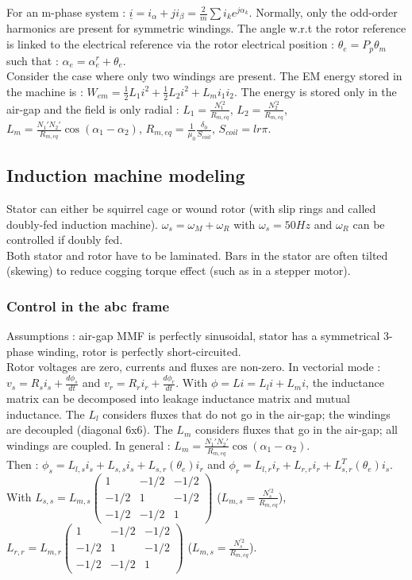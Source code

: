 \documentclass[../main.tex]{subfiles}
\begin{document}
For an m-phase system : $\underline{i} = i_\alpha + j i_\beta = \frac{2}{m} \sum i_k e^{j\alpha_k}$. Normally, only the odd-order harmonics are present for symmetric windings. The angle w.r.t the rotor reference is linked to the electrical reference via the rotor electrical position : $\theta_e = P_p \theta_m$ such that : $\alpha_e = \alpha_e^r + \theta_e$.\\

Consider the case where only two windings are present. The EM energy stored in the machine is : $W_{em} = \frac{1}{2} L_1 i^2 + \frac{1}{2}L_2 i^2 + L_m i_1 i_2$. The energy is stored only in the air-gap and the field is only radial : $L_1 = \frac{N_1^{'2}}{R_{m,eq}}$, $L_2 = \frac{N_2^{'2}}{R_{m,eq}}$, $L_m = \frac{N_1' N_2'}{R_{m,eq}} \cos(\alpha_1-\alpha_2)$, $R_{m,eq} = \frac{1}{\mu_0} \frac{\delta_0}{S_{coil}}$, $S_{coil} = lr\pi$.

\subsection{Induction machine modeling}
Stator can either be squirrel cage or wound rotor (with slip rings and called doubly-fed induction machine). $\omega_s = \omega_M + \omega_R$ with $\omega_s = 50Hz$ and $\omega_R$ can be controlled if doubly fed.\\
Both stator and rotor have to be laminated. Bars in the stator are often tilted (skewing) to reduce cogging torque effect (such as in a stepper motor). \\

\subsubsection{Control in the abc frame}
Assumptions : air-gap MMF is perfectly sinusoidal, stator has a symmetrical 3-phase winding, rotor is perfectly short-circuited. \\

Rotor voltages are zero, currents and fluxes are non-zero. In vectorial mode : $v_s = R_s i_s + \frac{d\phi_s}{dt}$ and $v_r = R_r i_r + \frac{d\phi_r}{dt}$. With $\phi = Li = L_l i + L_mi$, the inductance matrix can be decomposed into leakage inductance matrix and mutual inductance. The $L_l$ considers fluxes that do not go in the air-gap; the windings are decoupled (diagonal 6x6). The $L_m$ considers fluxes that go in the air-gap; all windings are coupled. In general : $L_m = \frac{N_1'N_2'}{R_{m,eq}} \cos(\alpha_1-\alpha_2)$.\\
Then : $\phi_s = L_{l,s} i_s + L_{s,s} i_s+ L_{s,r}(\theta_e) i_r$ and $\phi_r = L_{l,r} i_r + L_{r,r} i_r+ L_{s,r}^T(\theta_e) i_s$. With $L_{s,s} = L_{m,s} \begin{pmatrix}
    1&-1/2&-1/2\\-1/2&1&-1/2\\-1/2&-1/2&1
\end{pmatrix}$ ($L_{m,s} = \frac{N_s^{'2}}{R_{m,eq}}$), $L_{r,r} = L_{m,r} \begin{pmatrix}
    1&-1/2&-1/2\\-1/2&1&-1/2\\-1/2&-1/2&1
\end{pmatrix}$ ($L_{m,s} = \frac{N_s^{'2}}{R_{m,eq}}$).
\end{document}
